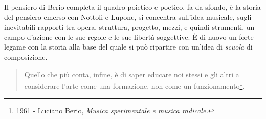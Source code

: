 Il pensiero di Berio completa il quadro poietico e poetico, fa da sfondo, è la storia
del pensiero emerso con Nottoli e Lupone, si concentra sull'idea musicale, sugli
inevitabili rapporti tra opera, struttura, progetto, mezzi, e quindi strumenti, un
campo d'azione con le sue regole e le sue libertà soggettive. È di nuovo un forte
legame con la storia alla base del quale si può ripartire con un'idea di \emph{scuola}
di composizione.

\begin{quote}
  Quello che più conta, infine, è di saper educare noi stessi e gli altri a
  considerare l'arte come una formazione, non come un
	funzionamento\footnote{1961 - Luciano Berio, \emph{Musica sperimentale e musica radicale.}}.
\end{quote}


